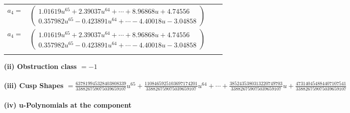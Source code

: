 \documentclass[1p]{elsarticle_modified}
\theoremstyle{definition}
\begin{document}
\begin{tabular}{m{7pt} m{180pt} m{7pt} m{180pt} }
\flushright $a_{4}=$&$\begin{pmatrix}1.01619 u^{65}+2.39037 u^{64}+\cdots+8.96868 u+4.74556\\0.357982 u^{65}-0.423891 u^{64}+\cdots-4.40018 u-3.04858\end{pmatrix}$\\ \flushright $a_{4}=$&$\begin{pmatrix}1.01619 u^{65}+2.39037 u^{64}+\cdots+8.96868 u+4.74556\\0.357982 u^{65}-0.423891 u^{64}+\cdots-4.40018 u-3.04858\end{pmatrix}$\\&\end{tabular}
\flushleft \textbf{(ii) Obstruction class $= -1$}\\~\\
\flushleft \textbf{(iii) Cusp Shapes $= \frac{637819945328403808339}{338826759075039659107} u^{65}+\frac{1108465925103697174201}{338826759075039659107} u^{64}+\cdots+\frac{3852435380313220749703}{338826759075039659107} u+\frac{473140454884407107541}{338826759075039659107}$}\\~\\
\newpage\renewcommand{\arraystretch}{1}
\flushleft \textbf{(iv) u-Polynomials at the component}\newline \\
\end{document}
